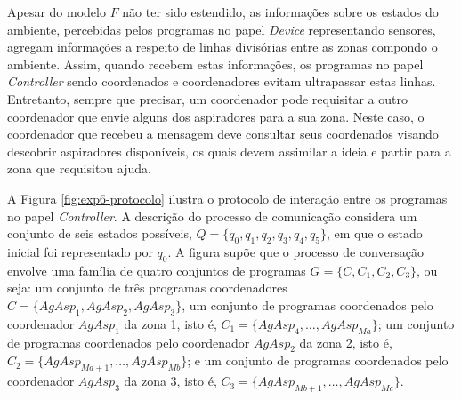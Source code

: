 Apesar do modelo $F$ não ter sido estendido, as informações sobre os estados do ambiente, percebidas pelos programas no papel \textit{Device} representando sensores, agregam informações a respeito de linhas divisórias entre as zonas compondo o ambiente. Assim, quando recebem estas informações, os programas no papel \textit{Controller} sendo coordenados e coordenadores evitam ultrapassar estas linhas. Entretanto, sempre que precisar, um coordenador pode requisitar a outro coordenador que envie alguns dos aspiradores para a sua zona. Neste caso, o coordenador que recebeu a mensagem deve consultar seus coordenados visando descobrir aspiradores disponíveis, os quais devem assimilar a ideia e partir para a zona que requisitou ajuda. 

A Figura \ref{fig:exp6-protocolo} ilustra o protocolo de interação entre os programas no papel \textit{Controller}. A descrição do processo de comunicação considera um conjunto de seis estados possíveis, $Q = \{q_0, q_1, q_2, q_3, q_4, q_5\}$, em que o estado inicial foi representado por $q_0$. A figura supõe que o processo de conversação envolve uma família de quatro conjuntos de programas $G = \{C, C_1, C_2, C_3\}$, ou seja: um conjunto de três programas coordenadores $C = \{AgAsp_1, AgAsp_2, AgAsp_3\}$, um conjunto de programas coordenados pelo coordenador $AgAsp_1$ da zona 1, isto é, $C_1 = \{AgAsp_4, \ldots, AgAsp_{Ma}\}$; um conjunto de programas coordenados pelo coordenador $AgAsp_2$ da zona 2, isto é, $C_2 = \{AgAsp_{Ma+1}, \ldots, AgAsp_{Mb}\}$; e um conjunto de programas coordenados pelo coordenador $AgAsp_3$ da zona 3, isto é, $C_3 = \{AgAsp_{Mb+1},  \ldots, AgAsp_{Mc}\}$.

\clearpage
\begin{figure}[h!]
    \centering
\end{figure}

